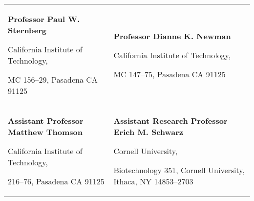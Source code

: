 
\begin{tabularx}{\textwidth}{@{}X X@{}}
\textbf{Professor Paul W. Sternberg}\par
  California Institute of Technology,\par
  MC 156--29, Pasadena CA 91125\par
  \makefield{\faEnvelopeO}{\url{pws@caltech.edu}}
&
\textbf{Professor Dianne K. Newman}\par
  California Institute of Technology,\par
  MC 147--75, Pasadena CA 91125\par
  \makefield{\faEnvelopeO}{\url{dkn@caltech.edu}}\\

\vspace{3mm}

\textbf{Assistant Professor Matthew Thomson}\par
  California Institute of Technology,\par
  216--76, Pasadena CA 91125\par
  \makefield{\faEnvelopeO}{\url{mthomson@caltech.edu}}
&
\vspace{3mm}
\textbf{Assistant Research Professor Erich M. Schwarz}\par
  Cornell University,\par
  Biotechnology 351, Cornell University, Ithaca, NY 14853--2703\par
  \makefield{\faEnvelopeO}{\url{ems394@cornell.edu}}
\end{tabularx}
